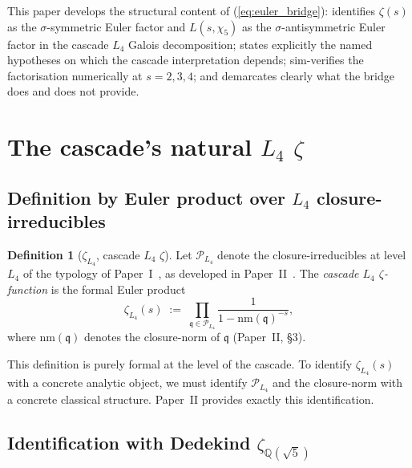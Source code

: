 \documentclass[11pt,a4paper]{article}
\theoremstyle{definition}
\newtheorem{definition}[theorem]{Definition}
\theoremstyle{remark}
\begin{document}
This paper develops the structural content of (\ref{eq:euler_bridge}):
identifies $\zeta(s)$ as the $\sigma$-symmetric Euler factor and
$L(s, \chi_5)$ as the $\sigma$-antisymmetric Euler factor in the
cascade $L_4$ Galois decomposition; states explicitly the named
hypotheses on which the cascade interpretation depends; sim-verifies
the factorisation numerically at $s = 2, 3, 4$; and demarcates clearly
what the bridge does and does not provide.

\section{The cascade's natural $L_4$ $\zeta$}\label{sec:l4_zeta}

\subsection{Definition by Euler product over $L_4$ closure-irreducibles}

\begin{definition}[$\zeta_{L_4}$, cascade $L_4$ $\zeta$]\label{def:zeta_L4}
Let $\mathcal{P}_{L_4}$ denote the closure-irreducibles at level $L_4$
of the typology of Paper~I~\cite{CriticalLinePaperI}, as developed in
Paper~II~\cite{ClosurePrimesPaperII}. The \emph{cascade $L_4$
$\zeta$-function} is the formal Euler product
\begin{equation}\label{eq:zeta_L4_def}
  \zeta_{L_4}(s) \;:=\;
    \prod_{\mathfrak{q} \in \mathcal{P}_{L_4}}
      \frac{1}{1 - \mathrm{nm}(\mathfrak{q})^{-s}},
\end{equation}
where $\mathrm{nm}(\mathfrak{q})$ denotes the closure-norm of
$\mathfrak{q}$ (Paper~II, \S 3).
\end{definition}

This definition is purely formal at the level of the cascade. To
identify $\zeta_{L_4}(s)$ with a concrete analytic object, we must
identify $\mathcal{P}_{L_4}$ and the closure-norm with a concrete
classical structure. Paper~II provides exactly this identification.

\subsection{Identification with Dedekind $\zeta_{\mathbb{Q}(\sqrt{5})}$}
\end{document}
